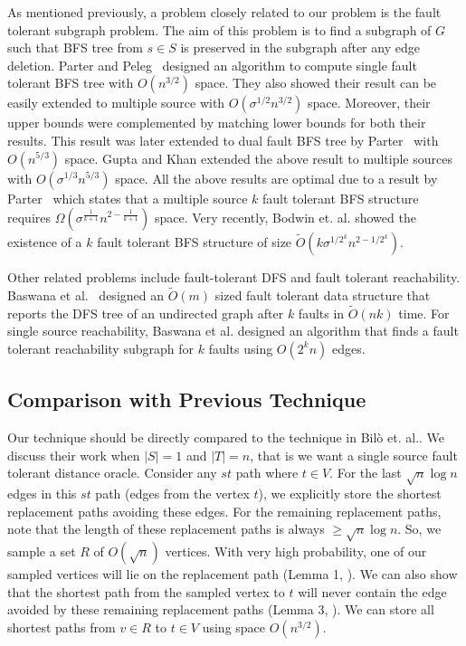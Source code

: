 As mentioned previously, a problem closely related to our problem is the fault tolerant subgraph problem. The aim of this problem is to
find a subgraph of $G$ such that BFS
tree from $s \in S$ is preserved in the subgraph after any
edge
deletion.
Parter and Peleg~\cite{ParterP13} designed an algorithm
to compute
single fault tolerant BFS tree with $O(n^{3/2})$ space.
They also showed their result can be easily extended
to multiple source with $O(\sigma^{1/2}n^{3/2})$ space.
Moreover, their upper bounds were complemented by matching
lower bounds for both their results.
This result was later extended to dual fault BFS tree  by
Parter~\cite{Parter15} with $O(n^{5/3})$ space.
Gupta and Khan \cite{GuptaK17} extended the above result
to
multiple sources with $O(\sigma^{1/3} n^{5 /3})$ space.
All the above results are optimal due to a result
by Parter~\cite{Parter15}  which states that a multiple
source $k$
fault tolerant BFS structure requires  $\Omega(\sigma^{\frac{1}{k+1}}n^{2-\frac{1}{k+1}})$
space.
Very recently, Bodwin et. al. \cite{BodwinGPW17} showed
the existence of a $k$ fault tolerant
BFS structure of size $\tilde O(k\sigma^{1/2^k}n^{2-1/2^k})$.

Other related problems include fault-tolerant DFS and fault
tolerant reachability.
Baswana et al.~\cite{BaswanaCCK16} designed an $\tilde{O}(m)$
sized fault tolerant data structure
that reports the DFS tree of an undirected graph after $k$
faults in $\tilde{O}(nk)$ time.
For single source reachability, Baswana et al. \cite{BaswanaCR16}
designed an algorithm
that finds a  fault tolerant reachability subgraph for
$k$ faults using $O(2^k n)$ edges.
\iflong
\else
\vspace{-2mm}
\fi


\iflong

\subsection{Comparison with Previous Technique}
Our technique should be directly compared to the technique
in Bil{\`{o}} et. al.\cite{BiloCGLP17}.
We discuss their work when $|S|=1$ and $|T|=n$, that is
we want a single source
fault tolerant distance oracle. Consider any $st$ path where
$t \in V$.
For the last $\sqrt n \log n$ edges in this $st$ path (edges
from the vertex $t$),
we explicitly store the shortest replacement paths avoiding
these edges.
For the remaining replacement paths, note that the length
of these replacement
paths is always $\ge \sqrt n \log n$. So, we sample a set
$R$ of $O(\sqrt n)$ vertices.
With very high probability, one of our sampled vertices will
lie on the replacement
path (Lemma 1, \cite{BiloCGLP17}).
We can also show that the shortest path from the sampled vertex
to $t$
will never contain the edge avoided by these remaining replacement
paths (Lemma 3, \cite{BiloCGLP17}).
We can store all  shortest paths from $v \in R$ to $t
\in V$ using space $O(n^{3/2})$.

